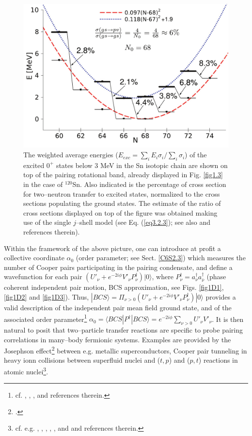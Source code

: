   \begin{figure}
  \centerline{\includegraphics*[width=\textwidth,angle=0]{nutshell/figs/fig2_1_4.pdf}}
  \caption{The weighted average energies ($E_{exc}=\sum_i E_i \sigma_i/\sum_i \sigma_i$) of the excited $0^+$ states below 3 MeV in the Sn isotopic chain are shown on top of the pairing rotational band, already displayed in Fig. \ref{fig1.3} in the case of $^{120}$Sn. Also indicated is the percentage of cross section for two--neutron transfer to excited states, normalized to the cross sections populating the ground states. The estimate of the ratio of cross sections displayed on top of the figure was obtained making use of the single $j$--shell model (see Eq. (\ref{eq3.2.3}); see also \cite{Brink:05} and references therein).}\label{fig1.4}
  \end{figure}
Within the framework of the above picture, one can introduce at profit a collective coordinate $\alpha_0$ (order parameter; see Sect. \ref{C6S2.3}) which measures the number of Cooper pairs participating in the pairing condensate, and define a wavefunction for each pair $\left(U'_\nu+e^{-2i\phi}V'_\nu P^\dagger_{\nu}\right)|0\rangle$, where $P^\dagger_{\nu}=a^\dagger_{\nu}a^\dagger_{\bar\nu}$ (phase coherent independent pair motion, BCS approximation, see Figs. \ref{fig1D1}, \ref{fig1D2} and \ref{fig1D3}). Thus,  $|BCS\rangle=\Pi_{\nu>0}\left(U'_\nu+e^{-2i\phi}V'_\nu P^\dagger_{\nu}\right)|0\rangle$ provides a valid description of the independent pair mean field ground state, and of the associated order parameter\footnote{cf. \cite{Bardeen:57a}, \cite{Bardeen:57b}, \cite{Schrieffer:64}, \cite{Schrieffer:73} and references therein.} $\alpha_0=\langle BCS|P^{\dagger}|BCS\rangle=e^{-2i\phi}\sum_{\nu>0}U'_\nu V'_\nu$.
It is then natural to posit that two--particle transfer reactions are specific to probe pairing correlations in many--body fermionic systems. Examples are provided by the Josephson effect\footnote{\cite{Josephson:62}.} between e.g. metallic superconductors, Cooper pair tunneling in heavy ionn collisions between superfluid nuclei and ($t,p$) and ($p,t$) reactions in atomic nuclei\footnote{cf. e.g. \cite{Yoshida:62}, \cite{Broglia:73}, \cite{Bayman:71}, \cite{Glendenning:65}, \cite{Bohr:64}, \cite{Hansen:12} and \cite{Potel:13} and references therein.}.


